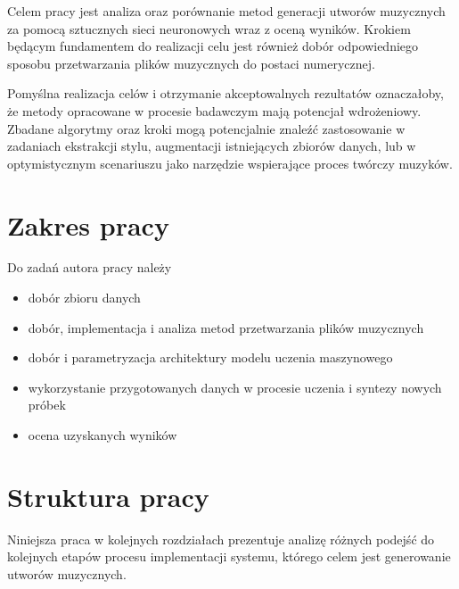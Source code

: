 {{        Celem pracy jest analiza oraz porównanie metod generacji utworów muzycznych za pomocą
        sztucznych sieci neuronowych wraz z oceną wyników. 
        Krokiem będącym fundamentem do realizacji celu jest również
        dobór odpowiedniego sposobu przetwarzania plików muzycznych do postaci numerycznej.
        
        
        Pomyślna realizacja celów i otrzymanie akceptowalnych rezultatów oznaczałoby, że
        metody opracowane w procesie badawczym mają potencjał wdrożeniowy. 
        Zbadane algorytmy oraz kroki mogą potencjalnie znaleźć zastosowanie
        w zadaniach ekstrakcji stylu, augmentacji istniejących zbiorów danych,
        lub w optymistycznym scenariuszu jako narzędzie wspierające proces twórczy muzyków.
    }

    \section{Zakres pracy}
    {
        Do zadań autora pracy należy
        \begin{itemize}
            \setlength\itemsep{-0.5em}
            \item dobór zbioru danych
            \item dobór, implementacja i analiza metod przetwarzania plików muzycznych
            \item dobór i parametryzacja architektury modelu uczenia maszynowego
            \item wykorzystanie przygotowanych danych 
            w procesie uczenia i syntezy nowych próbek
            \item ocena uzyskanych wyników
        \end{itemize}
    }

    \section{Struktura pracy}
    {
        Niniejsza praca w kolejnych rozdziałach prezentuje analizę różnych podejść do kolejnych etapów
        procesu implementacji systemu, którego celem jest generowanie utworów muzycznych. 

}}
